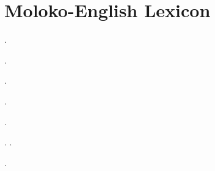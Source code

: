 \chapter{Moloko-English Lexicon}
\setlength{\parindent}{0pt}
\begin{multicols}{2}
\end{multicols}
\begin{styleLetterParagraph}
\end{styleLetterParagraph}


\begin{multicols}{2}
\begin{styleEntryParagraph}
	.
\end{styleEntryParagraph}

\begin{styleEntryParagraph}
	.
\end{styleEntryParagraph}

\begin{styleEntryParagraph}
	.
\end{styleEntryParagraph}

\begin{styleEntryParagraph}
	.
\end{styleEntryParagraph}

\begin{styleEntryParagraph}
	. 
\end{styleEntryParagraph}

\begin{styleEntryParagraph}
	. 
	.
\end{styleEntryParagraph}

\begin{styleEntryParagraph}
	.
\end{styleEntryParagraph}


\end{multicols}
